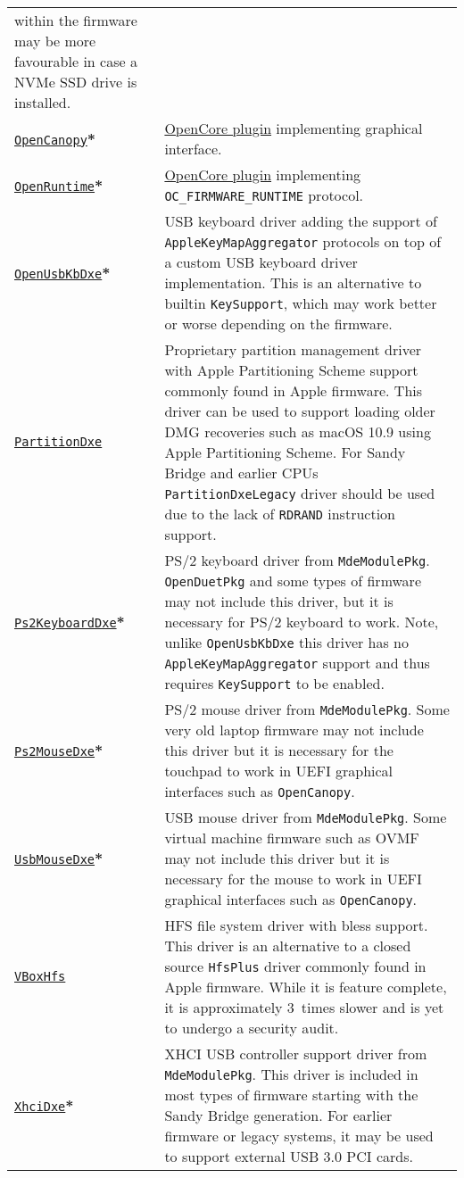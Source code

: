 \documentclass[]{article}
\begin{document}
\begin{tabular}{p{1.3in}p{5.55in}}
  within the firmware may be more favourable in case a NVMe SSD drive is installed. \\
\href{https://github.com/acidanthera/OpenCorePkg}{\texttt{OpenCanopy}}\textbf{*}
& \hyperref[ueficanopy]{OpenCore plugin} implementing graphical interface. \\
\href{https://github.com/acidanthera/OpenCorePkg}{\texttt{OpenRuntime}}\textbf{*}
& \hyperref[uefiruntime]{OpenCore plugin} implementing \texttt{OC\_FIRMWARE\_RUNTIME} protocol. \\
\href{https://github.com/acidanthera/OpenCorePkg}{\texttt{OpenUsbKbDxe}}\textbf{*}
& USB keyboard driver adding the support of \texttt{AppleKeyMapAggregator} protocols
  on top of a custom USB keyboard driver implementation. This is an alternative to
  builtin \texttt{KeySupport}, which may work better or worse depending on the firmware. \\
\href{https://github.com/acidanthera/OcBinaryData}{\texttt{PartitionDxe}}
& Proprietary partition management driver with Apple Partitioning Scheme support
  commonly found in Apple firmware. This driver can be used to support loading
  older DMG recoveries such as macOS 10.9 using Apple Partitioning Scheme.
  For Sandy Bridge and earlier CPUs \texttt{PartitionDxeLegacy} driver should be
  used due to the lack of \texttt{RDRAND} instruction support. \\
  \href{https://github.com/acidanthera/audk}{\texttt{Ps2KeyboardDxe}}\textbf{*}
& PS/2 keyboard driver from \texttt{MdeModulePkg}. \texttt{OpenDuetPkg} and some types of firmware
  may not include this driver, but it is necessary for PS/2 keyboard to work.
  Note, unlike \texttt{OpenUsbKbDxe} this driver has no \texttt{AppleKeyMapAggregator}
  support and thus requires \texttt{KeySupport} to be enabled. \\
  \href{https://github.com/acidanthera/audk}{\texttt{Ps2MouseDxe}}\textbf{*}
& PS/2 mouse driver from \texttt{MdeModulePkg}. Some very old laptop firmware
  may not include this driver but it is necessary for the touchpad to work
  in UEFI graphical interfaces such as \texttt{OpenCanopy}. \\
  \href{https://github.com/acidanthera/audk}{\texttt{UsbMouseDxe}}\textbf{*}
& USB mouse driver from \texttt{MdeModulePkg}. Some virtual machine firmware
  such as OVMF may not include this driver but it is necessary for the mouse to work
  in UEFI graphical interfaces such as \texttt{OpenCanopy}. \\
\href{https://github.com/acidanthera/OpenCorePkg}{\texttt{VBoxHfs}}
& HFS file system driver with bless support. This driver is an alternative to
  a closed source \texttt{HfsPlus} driver commonly found in Apple firmware. While
  it is feature complete, it is approximately 3~times slower and is yet to undergo
  a security audit. \\
\href{https://github.com/acidanthera/audk}{\texttt{XhciDxe}}\textbf{*}
& XHCI USB controller support driver from \texttt{MdeModulePkg}. This driver is
  included in most types of firmware starting with the Sandy Bridge generation. For earlier firmware
  or legacy systems, it may be used to support external USB 3.0 PCI cards.
\end{tabular}
\end{document}
